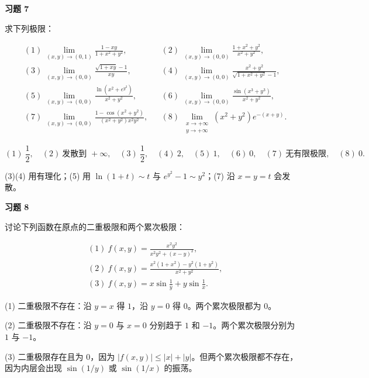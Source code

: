 \begin{exercisebox}
\textbf{习题 7}

求下列极限：

\[
      \begin{aligned}
      &(1)\ \lim_{(x,y)\to(0,1)}\frac{1-xy}{1+x^2+y^2},&
      &(2)\ \lim_{(x,y)\to(0,0)}\frac{1+x^2+y^2}{x^2+y^2},\\
      &(3)\ \lim_{(x,y)\to(0,0)}\frac{\sqrt{1+xy}-1}{xy},&
      &(4)\ \lim_{(x,y)\to(0,0)}\frac{x^2+y^2}{\sqrt{1+x^2+y^2}-1},\\
      &(5)\ \lim_{(x,y)\to(0,0)}\frac{\ln(x^2+e^{y^2})}{x^2+y^2},&
      &(6)\ \lim_{(x,y)\to(0,0)}\frac{\sin(x^3+y^3)}{x^2+y^2},\\
      &(7)\ \lim_{(x,y)\to(0,0)}\frac{1-\cos(x^2+y^2)}{(x^2+y^2)x^2y^2},&
      &(8)\ \lim_{\substack{x\to+\infty\\ y\to+\infty}}(x^2+y^2)e^{-(x+y)}.
      \end{aligned}
      \]

\begin{hintbox}
\[
        (1)\ \frac12,\quad
        (2)\ \text{发散到 }+\infty,\quad
        (3)\ \frac12,\quad
        (4)\ 2,\quad
        (5)\ 1,\quad
        (6)\ 0,\quad
        (7)\ \text{无有限极限},\quad
        (8)\ 0.
        \]

(3)(4) 用有理化；(5) 用 \(\ln(1+t)\sim t\) 与 \(e^{y^2}-1\sim y^2\)；(7) 沿 \(x=y=t\) 会发散。
\end{hintbox}
\end{exercisebox}

\begin{exercisebox}
\textbf{习题 8}

讨论下列函数在原点的二重极限和两个累次极限：

\[
      \begin{aligned}
      &(1)\ f(x,y)=\frac{x^2y^2}{x^2y^2+(x-y)^2},\\
      &(2)\ f(x,y)=\frac{x^2(1+x^2)-y^2(1+y^2)}{x^2+y^2},\\
      &(3)\ f(x,y)=x\sin\frac1y+y\sin\frac1x.
      \end{aligned}
      \]

\begin{hintbox}
(1) 二重极限不存在：沿 \(y=x\) 得 \(1\)，沿 \(y=0\) 得 \(0\)。两个累次极限都为 \(0\)。

(2) 二重极限不存在：沿 \(y=0\) 与 \(x=0\) 分别趋于 \(1\) 和 \(-1\)。两个累次极限分别为 \(1\) 与 \(-1\)。

(3) 二重极限存在且为 \(0\)，因为 \(|f(x,y)|\le |x|+|y|\)。但两个累次极限都不存在，因为内层会出现 \(\sin(1/y)\) 或 \(\sin(1/x)\) 的振荡。
\end{hintbox}
\end{exercisebox}

